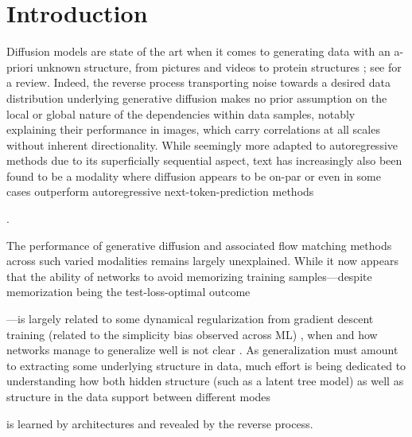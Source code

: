 \documentclass{article}
\newcommand{\jgb}[1]{{\color{jgbcolor}#1}}
\begin{document}
\section{Introduction}

\jgb{
Diffusion models are state of the art when it comes to generating data with an a-priori unknown structure}, from pictures
\cite{rombach2022latent,betker2023dalle3} and videos \cite{veo3} to protein structures \cite{abramson2024alphafold3};
see \cite{yang2023diffusion} for a review. \jgb{Indeed, the reverse process transporting noise towards a desired data distribution underlying generative diffusion makes no prior assumption on the local or global nature of the dependencies within data samples, notably explaining their performance in images, which carry correlations at all scales without inherent directionality. While seemingly more adapted to autoregressive methods due to its superficially sequential aspect, text has increasingly also been found to be a modality where diffusion appears to be on-par or even in some cases outperform autoregressive next-token-prediction methods} \cite{lou2024discrete,sahoo2024simple,nie2025large}\jgb{.

The performance of generative diffusion and associated flow matching methods across such varied modalities remains largely unexplained. While it now appears that the ability of networks to avoid memorizing training samples---despite memorization being the test-loss-optimal outcome} \cite{gu2023memorization}\jgb{---is largely related to some dynamical regularization from gradient descent training (related to the simplicity bias observed across ML)} \cite{bonnaire2025memorize,favero2025bigger}\jgb{, when and how networks manage to generalize well is not clear} \cite{marion2026understanding}\jgb{. As generalization must amount to extracting some underlying structure in data, much effort is being dedicated to understanding how both hidden structure (such as a latent tree model)} \cite{sclocchi2025phase,garnierbrun2024transformers,mei2024unets} \jgb{as well as structure in the data support between different modes} \cite{biroli2023generative,biroli2024dynamical,achilli2026speciation,garnierbrun2026foam} \jgb{is learned by architectures and revealed by the reverse process.

}
\end{document}
